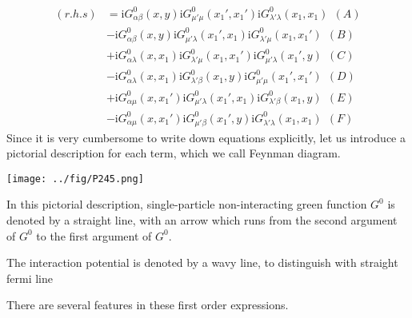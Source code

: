 \begin{align} \label{2.5.2}
(r.h.s)&=\mathrm{i}G_{\alpha\beta}^0(x,y)\mathrm{i}G^0_{\mu'\mu}(x_1',x_1')\mathrm{i}G^0_{\lambda'\lambda}(x_1,x_1) \ \ (A)\nonumber\\ 
&-\mathrm{i}G_{\alpha\beta}^0(x,y)\mathrm{i}G^0_{\mu'\lambda}(x_1',x_1)\mathrm{i}G^0_{\lambda'\mu}(x_1,x_1') \ \ (B)\nonumber \\
&+\mathrm{i}G_{\alpha\lambda}^0(x,x_1)\mathrm{i}G^0_{\lambda'\mu}(x_1,x_1')\mathrm{i}G^0_{\mu'\lambda}(x_1',y) \ \ (C)\nonumber \\
&-\mathrm{i}G_{\alpha\lambda}^0(x,x_1)\mathrm{i}G^0_{\lambda'\beta}(x_1,y)\mathrm{i}G^0_{\mu'\mu}(x_1',x_1') \ \ (D)\nonumber \\
&+\mathrm{i}G_{\alpha\mu}^0(x,x_1')\mathrm{i}G^0_{\mu'\lambda}(x_1',x_1)\mathrm{i}G^0_{\lambda'\beta}(x_1,y) \ \ (E)\nonumber \\
&-\mathrm{i}G_{\alpha\mu}^0(x,x_1')\mathrm{i}G^0_{\mu'\beta}(x_1',y)\mathrm{i}G^0_{\lambda'\lambda}(x_1,x_1) \ \ (F)
\end{align}
Since it is very cumbersome to write down equations explicitly, let us introduce a pictorial description for each term, which we call Feynman diagram.
\begin{center}
\texttt{[image: ../fig/P245.png]}
\end{center}
In this pictorial description, single-particle non-interacting green function $G^0$ is denoted by a straight line, with an arrow which runs from the second argument of $G^0$ to the first argument of $G^0$.

The interaction potential is denoted by a wavy line, to distinguish with straight fermi line%

	There are several features in these first order expressions.

